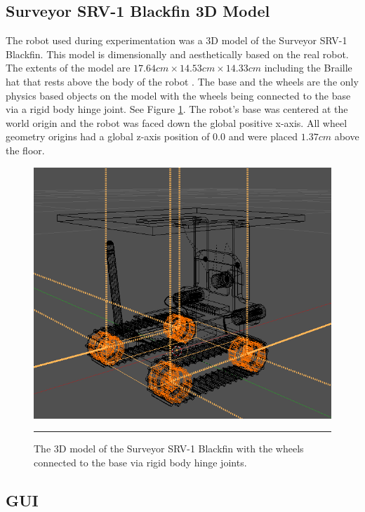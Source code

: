 \subsection{Surveyor SRV-1 Blackfin 3D Model}

The robot used during experimentation was a 3D model of the Surveyor SRV-1 Blackfin. This model is dimensionally and aesthetically based on the real robot. The extents of the model are $17.64cm\times14.53cm\times14.33cm$ including the Braille hat that rests above the body of the robot \cite{sklar-et-al-arms:2011}. The base and the wheels are the only physics based objects on the model with the wheels being connected to the base via a rigid body hinge joint. See Figure \ref{fig:srv1_3d_model}. The robot's base was centered at the world origin and the robot was faced down the global positive x-axis. All wheel geometry origins had a global z-axis position of 0.0 and were placed $1.37cm$ above the floor.   

\begin{figure}[htbp]
\centering
\includegraphics[scale=0.5]{../Figures/Chapter4/srv1.png}
\rule{35em}{0.5pt}
\caption[SRV-1 3D Model]{The 3D model of the Surveyor SRV-1 Blackfin with the wheels connected to the base via rigid body hinge joints.}
\label{fig:srv1_3d_model}
\end{figure}

\subsection{GUI}

